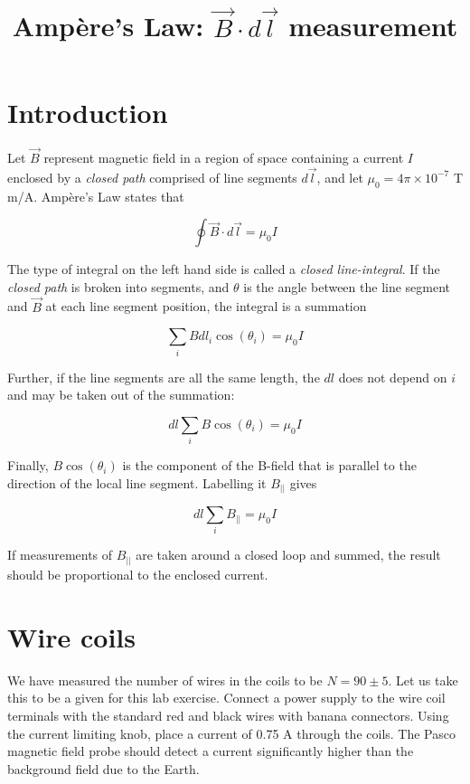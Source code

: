 \documentclass[12pt]{article}
\title{Amp\`{e}re's Law: $\vec{B} \cdot d\vec{l}$ measurement}
\begin{document}
\maketitle

\section{Introduction}

Let $\vec{B}$ represent magnetic field in a region of space containing a current $I$ enclosed by a \textit{closed path} comprised of line segments $d\vec{l}$, and let $\mu_0 = 4\pi \times 10^{-7}$ T m/A.  Amp\`{e}re's Law states that 

\begin{equation}
\oint\vec{B} \cdot d\vec{l} = \mu_0 I
\end{equation}

The type of integral on the left hand side is called a \textit{closed line-integral}.  If the \textit{closed path} is broken into segments, and $\theta$ is the angle between the line segment and $\vec{B}$ at each line segment position, the integral is a summation

\begin{equation}
\sum_i B dl_i \cos(\theta_i) = \mu_0 I
\end{equation}

Further, if the line segments are all the same length, the $dl$ does not depend on $i$ and may be taken out of the summation:

\begin{equation}
dl \sum_i B \cos(\theta_i) = \mu_0 I
\end{equation}

Finally, $B\cos(\theta_i)$ is the component of the B-field that is parallel to the direction of the local line segment.  Labelling it $B_{||}$ gives

\begin{equation}
dl \sum_i B_{||} = \mu_0 I \label{eq:main}
\end{equation}

If measurements of $B_{||}$ are taken around a closed loop and summed, the result should be proportional to the enclosed current.

\section{Wire coils}

We have measured the number of wires in the coils to be $N = 90\pm 5$.  Let us take this to be a given for this lab exercise.  Connect a power supply to the wire coil terminals with the standard red and black wires with banana connectors.  Using the current limiting knob, place a current of 0.75 A through the coils.  The Pasco magnetic field probe should detect a current significantly higher than the background field due to the Earth.
\end{document}
